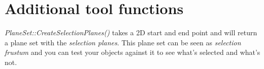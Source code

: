 \section{Additional tool functions}
\emph{PlaneSet::CreateSelectionPlanes()} takes a 2D start and end point and will return a plane set with the \emph{selection planes}. This plane set can be seen as \emph{selection frustum} and you can test your objects against it to see what's selected and what's not.
